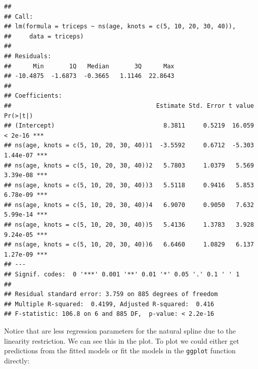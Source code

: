 \documentclass[
]{book}
\begin{document}
\begin{verbatim}
## 
## Call:
## lm(formula = triceps ~ ns(age, knots = c(5, 10, 20, 30, 40)), 
##     data = triceps)
## 
## Residuals:
##      Min       1Q   Median       3Q      Max 
## -10.4875  -1.6873  -0.3665   1.1146  22.8643 
## 
## Coefficients:
##                                        Estimate Std. Error t value Pr(>|t|)    
## (Intercept)                              8.3811     0.5219  16.059  < 2e-16 ***
## ns(age, knots = c(5, 10, 20, 30, 40))1  -3.5592     0.6712  -5.303 1.44e-07 ***
## ns(age, knots = c(5, 10, 20, 30, 40))2   5.7803     1.0379   5.569 3.39e-08 ***
## ns(age, knots = c(5, 10, 20, 30, 40))3   5.5118     0.9416   5.853 6.78e-09 ***
## ns(age, knots = c(5, 10, 20, 30, 40))4   6.9070     0.9050   7.632 5.99e-14 ***
## ns(age, knots = c(5, 10, 20, 30, 40))5   5.4136     1.3783   3.928 9.24e-05 ***
## ns(age, knots = c(5, 10, 20, 30, 40))6   6.6460     1.0829   6.137 1.27e-09 ***
## ---
## Signif. codes:  0 '***' 0.001 '**' 0.01 '*' 0.05 '.' 0.1 ' ' 1
## 
## Residual standard error: 3.759 on 885 degrees of freedom
## Multiple R-squared:  0.4199, Adjusted R-squared:  0.416 
## F-statistic: 106.8 on 6 and 885 DF,  p-value: < 2.2e-16
\end{verbatim}

Notice that are less regression parameters for the natural spline due to the
linearity restriction. We can see this in the plot. To plot we could either
get predictions from the fitted models or fit the models in the \texttt{ggplot}
function directly:
\end{document}

